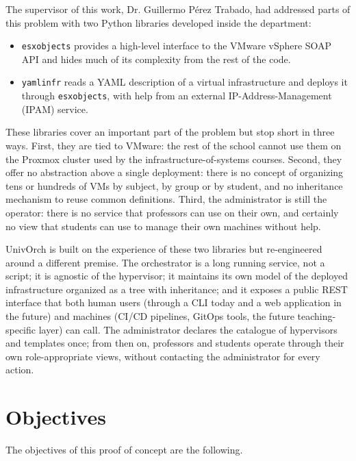 The supervisor of this work, Dr. Guillermo Pérez Trabado, had
addressed parts of this problem with two Python libraries developed
inside the department:

\begin{itemize}
  \item \texttt{esxobjects} provides a high-level interface to the
        VMware vSphere SOAP API and hides much of its complexity from
        the rest of the code.
  \item \texttt{yamlinfr} reads a YAML description of a virtual
        infrastructure and deploys it through \texttt{esxobjects},
        with help from an external IP-Address-Management (IPAM)
        service.
\end{itemize}

These libraries cover an important part of the problem but stop
short in three ways. First, they are tied to VMware: the rest of the
school cannot use them on the Proxmox cluster used by the
infrastructure-of-systems courses. Second, they offer no abstraction
above a single deployment: there is no concept of organizing tens or
hundreds of VMs by subject, by group or by student, and no inheritance
mechanism to reuse common definitions. Third, the administrator is
still the operator: there is no service that professors can use on
their own, and certainly no view that students can use to manage their
own machines without help.

UnivOrch is built on the experience of these two libraries but
re-engineered around a different premise. The orchestrator is a long
running service, not a script; it is agnostic of the hypervisor; it
maintains its own model of the deployed infrastructure organized as a
tree with inheritance; and it exposes a public REST interface that
both human users (through a CLI today and a web application in the
future) and machines (CI/CD pipelines, GitOps tools, the future
teaching-specific layer) can call. The administrator declares the
catalogue of hypervisors and templates once; from then on, professors
and students operate through their own role-appropriate views,
without contacting the administrator for every action.

\section{Objectives}
\label{sec:objetivos}

The objectives of this proof of concept are the following.


